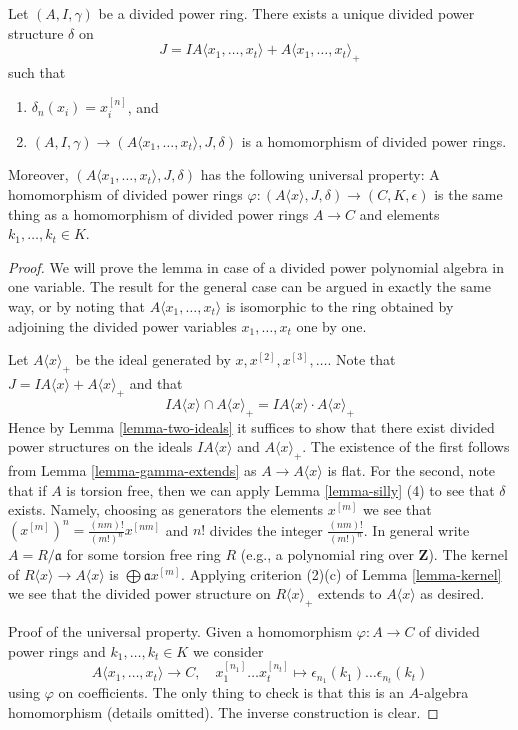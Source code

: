 \begin{lemma}
\label{lemma-divided-power-polynomial-algebra}
Let $(A, I, \gamma)$ be a divided power ring.
There exists a unique divided power structure $\delta$ on
$$
J = IA\langle x_1, \ldots, x_t \rangle + A\langle x_1, \ldots, x_t \rangle_{+}
$$
such that
\begin{enumerate}
\item $\delta_n(x_i) = x_i^{[n]}$, and
\item $(A, I, \gamma) \to (A\langle x_1, \ldots, x_t \rangle, J, \delta)$
is a homomorphism of divided power rings.
\end{enumerate}
Moreover, $(A\langle x_1, \ldots, x_t \rangle, J, \delta)$ has the
following universal property: A homomorphism of divided power rings
$\varphi : (A\langle x \rangle, J, \delta) \to (C, K, \epsilon)$ is
the same thing as a homomorphism of divided power rings
$A \to C$ and elements $k_1, \ldots, k_t \in K$.
\end{lemma}

\begin{proof}
We will prove the lemma in case of a divided power polynomial algebra
in one variable. The result for the general case can be argued in exactly
the same way, or by noting that $A\langle x_1, \ldots, x_t\rangle$ is
isomorphic to the ring obtained by adjoining the divided power variables
$x_1, \ldots, x_t$ one by one.

\medskip\noindent
Let $A\langle x \rangle_{+}$ be the ideal generated by
$x, x^{[2]}, x^{[3]}, \ldots$.
Note that $J = IA\langle x \rangle + A\langle x \rangle_{+}$
and that
$$
IA\langle x \rangle \cap A\langle x \rangle_{+} =
IA\langle x \rangle \cdot A\langle x \rangle_{+}
$$
Hence by Lemma \ref{lemma-two-ideals} it suffices to show that there
exist divided power structures on the ideals $IA\langle x \rangle$ and
$A\langle x \rangle_{+}$. The existence of the first follows from
Lemma \ref{lemma-gamma-extends} as $A \to A\langle x \rangle$ is flat.
For the second, note that if $A$ is torsion free, then we can apply
Lemma \ref{lemma-silly} (4) to see that $\delta$ exists. Namely, choosing
as generators the elements $x^{[m]}$ we see that
$(x^{[m]})^n = \frac{(nm)!}{(m!)^n} x^{[nm]}$
and $n!$ divides the integer $\frac{(nm)!}{(m!)^n}$.
In general write $A = R/\mathfrak a$ for some torsion free ring $R$
(e.g., a polynomial ring over $\mathbf{Z}$). The kernel of
$R\langle x \rangle \to A\langle x \rangle$ is
$\bigoplus \mathfrak a x^{[m]}$. Applying criterion (2)(c) of
Lemma \ref{lemma-kernel} we see that the divided power structure
on $R\langle x \rangle_{+}$ extends to $A\langle x \rangle$ as
desired.

\medskip\noindent
Proof of the universal property. Given a homomorphism $\varphi : A \to C$
of divided power rings and $k_1, \ldots, k_t \in K$ we consider
$$
A\langle x_1, \ldots, x_t \rangle \to C,\quad
x_1^{[n_1]} \ldots x_t^{[n_t]} \longmapsto
\epsilon_{n_1}(k_1) \ldots \epsilon_{n_t}(k_t)
$$
using $\varphi$ on coefficients. The only thing to check is that
this is an $A$-algebra homomorphism (details omitted). The inverse
construction is clear.
\end{proof}


